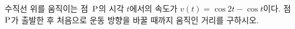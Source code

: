 \hspace*{2mm}\begin{minipage}[t]{\dimexpr\linewidth-2mm\relax}\vspace{0pt}
수직선 위를 움직이는 점~$\mathrm{P}$의 시각 $t$에서의 속도가 $v(t)=\cos 2t-\cos t$이다. 점~$\mathrm{P}$가 출발한 후 처음으로 운동 방향을 바꿀 때까지 움직인 거리를 구하시오.\end{minipage}
